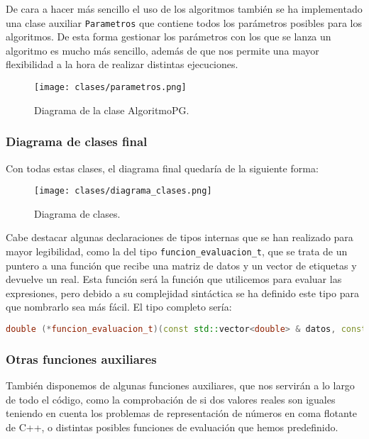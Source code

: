 De cara a hacer más sencillo el uso de los algoritmos también se ha implementado una clase auxiliar \texttt{Parametros} que contiene todos los parámetros posibles para los algoritmos. De esta forma gestionar los parámetros con los que se lanza un algoritmo es mucho más sencillo, además de que nos permite una mayor flexibilidad a la hora de realizar distintas ejecuciones.

\begin{figure}[H]
	 \centering
	 \texttt{[image: clases/parametros.png]}
	 \caption{Diagrama de la clase AlgoritmoPG.}
	\label{fig:diagrama_clase_parametros}
\end{figure}


\subsubsection{Diagrama de clases final}

Con todas estas clases, el diagrama final quedaría de la siguiente forma:

\begin{figure}[H]
	 \centering
	 \texttt{[image: clases/diagrama\_clases.png]}
	 \caption{Diagrama de clases.}
	\label{fig:diagrama_clases}
\end{figure}

Cabe destacar algunas declaraciones de tipos internas que se han realizado para mayor legibilidad, como la del tipo \texttt{funcion\_evaluacion\_t}, que se trata de un puntero a una función que recibe una matriz de datos y un vector de etiquetas y devuelve un real. Esta función será la función que utilicemos para evaluar las expresiones, pero debido a su complejidad sintáctica se ha definido este tipo para que nombrarlo sea más fácil. El tipo completo sería:

\begin{lstlisting}[language=C++]
double (*funcion_evaluacion_t)(const std::vector<double> & datos, const std::vector<double> & etiquetas)
\end{lstlisting}

\subsubsection{Otras funciones auxiliares}

También disponemos de algunas funciones auxiliares, que nos servirán a lo largo de todo el código, como la comprobación de si dos valores reales son iguales teniendo en cuenta los problemas de representación de números en coma flotante de C++, o distintas posibles funciones de evaluación que hemos predefinido.

